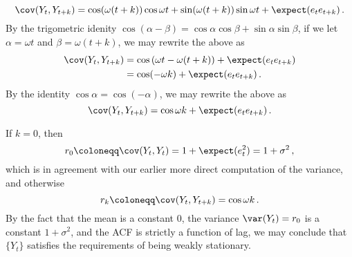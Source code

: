 {\begin{equation}
    \cov(Y_t,Y_{t+k}) = \cos(\omega(t+k)) \cos \omega t + \sin(\omega(t+k)) \sin \omega t + \expect(e_t e_{t+k})\,.
\end{equation}
By the trigometric idenity $\cos (\alpha - \beta) = \cos \alpha \cos \beta + \sin \alpha \sin \beta$, if we let $\alpha = \omega t$ and $\beta = \omega(t+k)$,
we may rewrite the above as
\begin{equation}
\begin{split}
    \cov(Y_t,Y_{t+k}) &= \cos \left(\omega t - \omega(t+k)\right) + \expect(e_t e_{t+k})\\
                      &= \cos (-\omega k) + \expect(e_t e_{t+k})\,.
\end{split}
\end{equation}
By the identity $\cos \alpha = \cos(-\alpha)$, we may rewrite the above as
\begin{equation}
\cov(Y_t,Y_{t+k}) = \cos \omega k + \expect(e_t e_{t+k})\,.
\end{equation}

If $k = 0$, then 
\begin{equation}
    r_0 \coloneqq \cov(Y_t,Y_t) = 1 + \expect(e^2_t) = 1 + \sigma^2\,,
\end{equation}
which is in agreement with our earlier more direct computation of the variance,
and otherwise
\begin{equation}
    r_k \coloneqq \cov(Y_t,Y_{t+k}) = \cos \omega k\,.
\end{equation}
By the fact that the mean is a constant $0$, the variance $\var(Y_t) = r_0$ is a constant $1 + \sigma^2$, and the ACF is strictly a function of lag,
we may conclude that $\{Y_t\}$ satisfies the requirements of being weakly stationary.}
